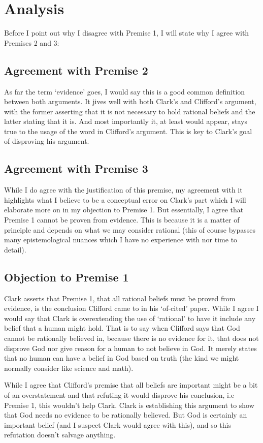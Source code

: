 \documentclass{article}
\begin{document}
\section{Analysis}
Before I point out why I disagree with Premise 1, I will state why I agree with Premises 2 and 3:
\subsection{Agreement with Premise 2}
As far the term `evidence' goes, I would say this is a good common definition between both arguments. It jives well with both Clark's and Clifford's argument, with the former asserting that it is not necessary to hold rational beliefs and the latter stating that it is. And most importantly it, at least would appear, stays true to the usage of the word in Clifford's argument. This is key to Clark's goal of disproving his argument.

\subsection{Agreement with Premise 3}
While I do agree with the justification of this premise, my agreement with it highlights what I believe to be a conceptual error on Clark's part which I will elaborate more on in my objection to Premise 1. But essentially, I agree that Premise 1 cannot be proven from evidence. This is because it is a matter of principle and depends on what we may consider rational (this of course bypasses many epistemological nuances which I have no experience with nor time to detail).

\subsection{Objection to Premise 1}
Clark asserts that Premise 1, that all rational beliefs must be proved from evidence, is the conclusion Clifford came to in his `of-cited' paper. While I agree I would say that Clark is overextending the use of `rational' to have it include any belief that a human might hold. That is to say when Clifford says that God cannot be rationally believed in, because there is no evidence for it, that does not disprove God nor give reason for a human to not believe in God. It merely states that no human can have a belief in God based on truth (the kind we might normally consider like science and math).

While I agree that Clifford's premise that all beliefs are important might be a bit of an overstatement and that refuting it would disprove his conclusion, i.e Premise 1, this wouldn't help Clark. Clark is establishing this argument to show that God needs no evidence to be rationally believed. But God is certainly an important belief (and I suspect Clark would agree with this), and so this refutation doesn't salvage anything.
\end{document}
